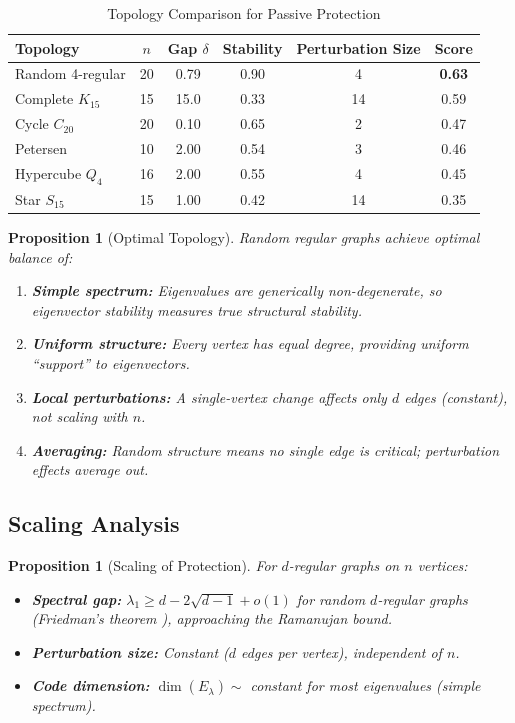\documentclass[11pt,a4paper]{article}
\newtheorem{proposition}[theorem]{Proposition}
\theoremstyle{definition}
\begin{document}
\begin{table}[h]
\centering
\caption{Topology Comparison for Passive Protection}
\label{tab:topology}
\begin{tabular}{lccccc}
\toprule
Topology & $n$ & Gap $\delta$ & Stability & Perturbation Size & Score \\
\midrule
Random 4-regular & 20 & 0.79 & 0.90 & 4 & \textbf{0.63} \\
Complete $K_{15}$ & 15 & 15.0 & 0.33 & 14 & 0.59 \\
Cycle $C_{20}$ & 20 & 0.10 & 0.65 & 2 & 0.47 \\
Petersen & 10 & 2.00 & 0.54 & 3 & 0.46 \\
Hypercube $Q_4$ & 16 & 2.00 & 0.55 & 4 & 0.45 \\
Star $S_{15}$ & 15 & 1.00 & 0.42 & 14 & 0.35 \\
\bottomrule
\end{tabular}
\end{table}

\begin{proposition}[Optimal Topology]
\label{prop:optimal}
Random regular graphs achieve optimal balance of:
\begin{enumerate}[noitemsep]
    \item \textbf{Simple spectrum:} Eigenvalues are generically non-degenerate, so eigenvector stability measures true structural stability.
    \item \textbf{Uniform structure:} Every vertex has equal degree, providing uniform ``support'' to eigenvectors.
    \item \textbf{Local perturbations:} A single-vertex change affects only $d$ edges (constant), not scaling with $n$.
    \item \textbf{Averaging:} Random structure means no single edge is critical; perturbation effects average out.
\end{enumerate}
\end{proposition}

\subsection{Scaling Analysis}

\begin{proposition}[Scaling of Protection]
\label{prop:scaling}
For $d$-regular graphs on $n$ vertices:
\begin{itemize}[noitemsep]
    \item \textbf{Spectral gap:} $\lambda_1 \geq d - 2\sqrt{d-1} + o(1)$ for random $d$-regular graphs (Friedman's theorem \cite{friedman2008proof}), approaching the Ramanujan bound.
    \item \textbf{Perturbation size:} Constant ($d$ edges per vertex), independent of $n$.
    \item \textbf{Code dimension:} $\dim(E_\lambda) \sim$ constant for most eigenvalues (simple spectrum).
\end{itemize}
\end{proposition}
\end{document}
